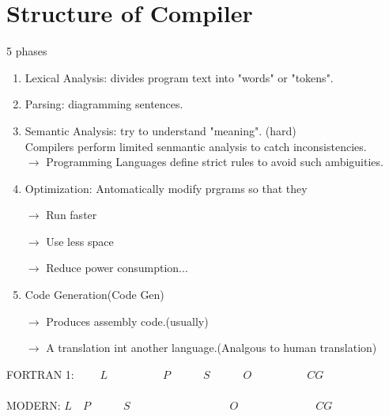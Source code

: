     \section{\textcolor{StanfordRed}{Structure of Compiler}}
    5 phases
    \begin{enumerate}
        \item \textcolor{StanfordRed}{Lexical Analysis}: divides program text into "words" or "tokens".
        \item \textcolor{StanfordRed}{Parsing}: diagramming sentences.
        \item \textcolor{StanfordRed}{Semantic Analysis}: try to understand "meaning". (hard)\\
        Compilers perform limited senmantic analysis to catch inconsistencies.\\
        \(\rightarrow\) Programming Languages define strict rules to avoid such ambiguities.
        \item \textcolor{StanfordRed}{Optimization}: Antomatically modify prgrams so that they
        
        \(\rightarrow\) Run faster

        \(\rightarrow\) Use less space

        \(\rightarrow\) Reduce power consumption...

        \item \textcolor{StanfordRed}{Code Generation(Code Gen)}
        
        \(\rightarrow\) Produces assembly code.(usually)

        \(\rightarrow\) A translation int another language.(Analgous to human translation)

    \end{enumerate}
    \begin{flushleft}
        FORTRAN 1: \(\boxed{\quad\quad L \quad\quad}\quad\boxed{\quad\quad P \quad\quad}\quad\boxed{S}\quad\boxed{\quad\quad O \quad\quad}\quad\boxed{\quad\quad CG \quad\quad}\)\\
        \hspace*{\fill} \\
        \quad MODERN: \(\boxed{ L }\quad\boxed{ P }\quad\boxed{\quad\quad S\quad\quad}\quad\boxed{\quad\quad\quad\quad\quad\quad O \quad\quad\quad\quad\quad\quad}\quad\boxed{ CG }\)\\
    \end{flushleft}
    
